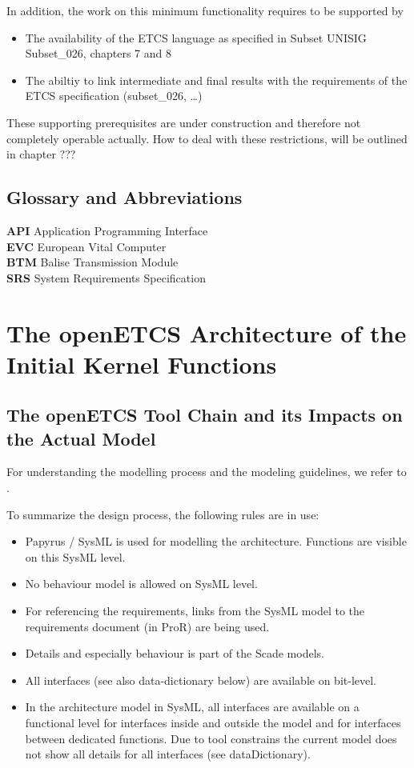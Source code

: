 \documentclass{template/openetcs_report}
\begin{document}
In addition, the work on this minimum functionality requires to be supported by
\begin{itemize}
	\item The availability of the ETCS language as specified in Subset UNISIG Subset\_026, chapters 7 and 8
	\item The abiltiy to link intermediate and final results with the requirements of the ETCS specification (subset\_026, \dots) 
\end{itemize}
These supporting prerequisites are under construction and therefore not completely operable actually. How to deal with these restrictions, will be outlined in chapter ???

\section{Glossary and Abbreviations}

\textbf{API} Application Programming Interface\\
\textbf{EVC} European Vital Computer\\
\textbf{BTM} Balise Transmission Module\\
\textbf{SRS} System Requirements Specification\\





\chapter{The openETCS Architecture of the Initial Kernel Functions}

\section{The openETCS Tool Chain and its Impacts on the Actual Model}

For understanding the modelling process and the modeling guidelines, we refer to \cite{wp3-dow}. 

To summarize the design process, the following rules are in use:
\begin{itemize}
\item Papyrus / SysML is used for modelling the architecture. Functions are visible on this SysML level.
\item No behaviour model is allowed on SysML level.
\item For referencing the requirements, links from the SysML model to the requirements document (in ProR) are being used.
\item Details and especially behaviour is part of the Scade models.
\item All interfaces (see also data-dictionary below) are available on bit-level.
\item In the architecture model in SysML, all interfaces are available on a functional level for interfaces inside and outside the model and for interfaces between dedicated functions. Due to tool constrains the current model does not show all details for all interfaces (see dataDictionary).
\end{itemize}
\end{document}
